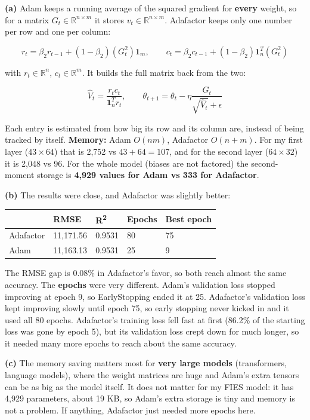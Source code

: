 \documentclass[12pt,a4paper]{article}
\begin{document}
\begin{answerbox}
\textbf{(a)} Adam keeps a running average of the squared gradient for \textbf{every} weight, so for a matrix \(G_t\in\mathbb{R}^{n\times m}\) it stores \(v_t\in\mathbb{R}^{n\times m}\). Adafactor keeps only one number per row and one per column:

\[r_t=\beta_2r_{t-1}+(1-\beta_2)(G_t^2)\mathbf{1}_m,\qquad c_t=\beta_2c_{t-1}+(1-\beta_2)\mathbf{1}_n^T(G_t^2)\]

with \(r_t\in\mathbb{R}^n\), \(c_t\in\mathbb{R}^m\). It builds the full matrix back from the two:

\[\hat V_t=\frac{r_tc_t}{\mathbf{1}_n^Tr_t},\qquad \theta_{t+1}=\theta_t-\eta\frac{G_t}{\sqrt{\hat V_t}+\epsilon}\]

Each entry is estimated from how big its row and its column are, instead of being tracked by itself. \textbf{Memory:} Adam \(O(nm)\), Adafactor \(O(n+m)\). For my first layer (\(43\times64\)) that is 2,752 vs \(43+64=107\), and for the second layer (\(64\times32\)) it is 2,048 vs 96. For the whole model (biases are not factored) the second-moment storage is \textbf{4,929 values for Adam vs 333 for Adafactor}.

\textbf{(b)} The results were close, and Adafactor was slightly better:

\begin{center}\small
\begin{tabular}{@{}lllll@{}}
\toprule
& RMSE & R\textsuperscript{2} & Epochs & Best epoch \\
\midrule
Adafactor & 11,171.56 & 0.9531 & 80 & 75 \\
Adam & 11,163.13 & 0.9531 & 25 & 9 \\
\bottomrule
\end{tabular}
\end{center}

The RMSE gap is 0.08\% in Adafactor's favor, so both reach almost the same accuracy. The \textbf{epochs} were very different. Adam's validation loss stopped improving at epoch 9, so EarlyStopping ended it at 25. Adafactor's validation loss kept improving slowly until epoch 75, so early stopping never kicked in and it used all 80 epochs. Adafactor's training loss fell fast at first (86.2\% of the starting loss was gone by epoch 5), but its validation loss crept down for much longer, so it needed many more epochs to reach about the same accuracy.

\textbf{(c)} The memory saving matters most for \textbf{very large models} (transformers, language models), where the weight matrices are huge and Adam's extra tensors can be as big as the model itself. It does not matter for my FIES model: it has 4,929 parameters, about 19 KB, so Adam's extra storage is tiny and memory is not a problem. If anything, Adafactor just needed more epochs here.

\end{answerbox}
\end{document}
